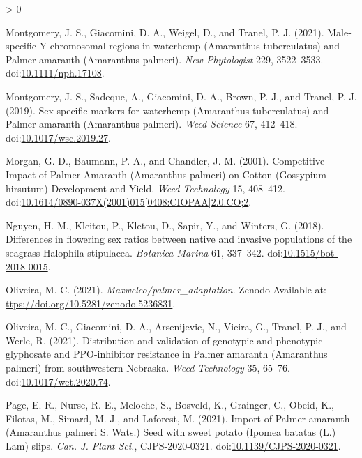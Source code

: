 \documentclass[utf8]{frontiersSCNS}
\newlength{\cslhangindent}
\newenvironment{CSLReferences}[2] %
 {%
  \setlength{\parindent}{0pt}
  \ifodd #1 \everypar{\setlength{\hangindent}{\cslhangindent}}\ignorespaces\fi
  \ifnum #2 > 0
  \setlength{\parskip}{#2\baselineskip}
  \fi
 }%
 {}
\begin{document}
\begin{CSLReferences}{1}{0}
\leavevmode\hypertarget{ref-montgomery2021}{}%
Montgomery, J. S., Giacomini, D. A., Weigel, D., and Tranel, P. J.
(2021). Male-specific {Y}-chromosomal regions in waterhemp ({Amaranthus}
tuberculatus) and {Palmer} amaranth ({Amaranthus} palmeri). \emph{New
Phytologist} 229, 3522--3533.
doi:\href{https://doi.org/10.1111/nph.17108}{10.1111/nph.17108}.

\leavevmode\hypertarget{ref-montgomery2019}{}%
Montgomery, J. S., Sadeque, A., Giacomini, D. A., Brown, P. J., and
Tranel, P. J. (2019). Sex-specific markers for waterhemp ({Amaranthus}
tuberculatus) and {Palmer} amaranth ({Amaranthus} palmeri). \emph{Weed
Science} 67, 412--418.
doi:\href{https://doi.org/10.1017/wsc.2019.27}{10.1017/wsc.2019.27}.

\leavevmode\hypertarget{ref-morgan2001}{}%
Morgan, G. D., Baumann, P. A., and Chandler, J. M. (2001). Competitive
{Impact} of {Palmer Amaranth} ({Amaranthus} palmeri) on {Cotton}
({Gossypium} hirsutum) {Development} and {Yield}. \emph{Weed Technology}
15, 408--412.
doi:\href{https://doi.org/10.1614/0890-037X(2001)015\%5B0408:CIOPAA\%5D2.0.CO;2}{10.1614/0890-037X(2001)015{[}0408:CIOPAA{]}2.0.CO;2}.

\leavevmode\hypertarget{ref-nguyen2018}{}%
Nguyen, H. M., Kleitou, P., Kletou, D., Sapir, Y., and Winters, G.
(2018). Differences in flowering sex ratios between native and invasive
populations of the seagrass {Halophila} stipulacea. \emph{Botanica
Marina} 61, 337--342.
doi:\href{https://doi.org/10.1515/bot-2018-0015}{10.1515/bot-2018-0015}.

\leavevmode\hypertarget{ref-oliveira2021b}{}%
Oliveira, M. C. (2021). \emph{Maxwelco/palmer\_adaptation}. {Zenodo}
Available at: \url{ttps://doi.org/10.5281/zenodo.5236831}.

\leavevmode\hypertarget{ref-oliveira2021a}{}%
Oliveira, M. C., Giacomini, D. A., Arsenijevic, N., Vieira, G., Tranel,
P. J., and Werle, R. (2021). Distribution and validation of genotypic
and phenotypic glyphosate and {PPO}-inhibitor resistance in {Palmer}
amaranth ({Amaranthus} palmeri) from southwestern {Nebraska}. \emph{Weed
Technology} 35, 65--76.
doi:\href{https://doi.org/10.1017/wet.2020.74}{10.1017/wet.2020.74}.

\leavevmode\hypertarget{ref-page2021}{}%
Page, E. R., Nurse, R. E., Meloche, S., Bosveld, K., Grainger, C.,
Obeid, K., Filotas, M., Simard, M.-J., and Laforest, M. (2021). Import
of {Palmer} amaranth ({Amaranthus} palmeri {S}. {Wats}.) Seed with sweet
potato ({Ipomea} batatas ({L}.) {Lam}) slips. \emph{Can. J. Plant Sci.},
CJPS-2020-0321.
doi:\href{https://doi.org/10.1139/CJPS-2020-0321}{10.1139/CJPS-2020-0321}.


\end{CSLReferences}
\end{document}
